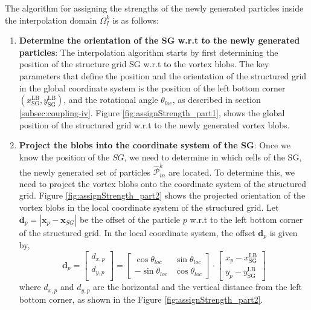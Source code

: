 	The algorithm for assigning the strengths of the newly generated particles inside the interpolation domain $\Omega_I^k$ is as follows:
	\begin{enumerate}[label=4.\alph*)]
	\item \textbf{Determine the orientation of the SG w.r.t to the newly generated particles}: The interpolation algorithm starts by first determining the position of the structure grid SG w.r.t to the vortex blobs. The key parameters that define the position and the orientation of the structured grid in the global coordinate system is the position of the left bottom corner $(x_{\mathrm{SG}}^{\mathrm{LB}},y_{\mathrm{SG}}^{\mathrm{LB}})$, and the rotational angle $\theta_{loc}$, as described in section \ref{subsec:coupling-iv}. Figure \ref{fig:assignStrength_part1}, shows the global position of the structured grid w.r.t to the newly generated vortex blobs.
	
	\item \textbf{Project the blobs into the coordinate system of the SG}: Once we know the position of the $SG$, we need to determine in which cells of the SG, the newly generated set of particles $\hat{\mathcal{P}}_{in}^k$ are located. To determine this, we need to project the vortex blobs onto the coordinate system of the structured grid. Figure \ref{fig:assignStrength_part2} shows the projected orientation of the vortex blobs in the local coordinate system of the structured grid. Let $\mathbf{d}_p = |\mathbf{x}_p-\mathbf{x}_{SG}|$ be the offset of the particle $p$ w.r.t to the left bottom corner of the structured grid. In the local coordinate system, the offset $\mathbf{d}_p$ is given by,
		\begin{equation}
		\mathbf{d}_p = 
		\begin{bmatrix}
		d_{x,p}\\
		d_{y,p}\\
		\end{bmatrix} = \begin{bmatrix}
		\cos\theta_{loc} & \sin\theta_{loc}  \\
		-\sin\theta_{loc}  & \cos\theta_{loc} 
		\end{bmatrix} \cdot \begin{bmatrix}
		x_{p}-x_{\mathrm{SG}}^{\mathrm{LB}}\\
		y_{p}-y_{\mathrm{SG}}^{\mathrm{LB}}
		\end{bmatrix}
		\end{equation}
	where $d_{x,p}$ and $d_{y,p}$ are the horizontal and the vertical distance from the left bottom corner, as shown in the Figure \ref{fig:assignStrength_part2}. 
	

\end{enumerate}
